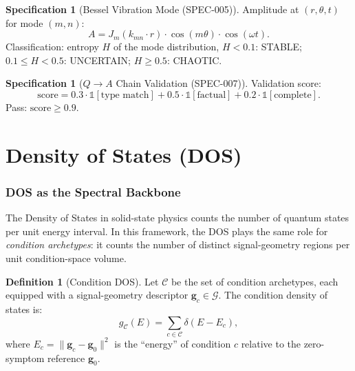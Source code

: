 \documentclass[11pt,twoside]{article}
\theoremstyle{plain}
\theoremstyle{definition}
\newtheorem{definition}[theorem]{Definition}
\newtheorem{specification}[theorem]{Specification}
\theoremstyle{remark}
\begin{document}
\begin{specification}[Bessel Vibration Mode (SPEC-005)]\label{spec:bessel}
Amplitude at $(r,\theta,t)$ for mode $(m,n)$:
\begin{equation}
  A = J_m(k_{mn}\cdot r)\cdot\cos(m\theta)\cdot\cos(\omega t).
\end{equation}
Classification: entropy $H$ of the mode distribution,
$H<0.1$: STABLE; $0.1\le H<0.5$: UNCERTAIN; $H\ge 0.5$: CHAOTIC.
\end{specification}

\begin{specification}[$Q\to A$ Chain Validation (SPEC-007)]\label{spec:qa}
Validation score:
\begin{equation}
  \mathrm{score} = 0.3\cdot\mathbb{1}[\text{type match}]
                 + 0.5\cdot\mathbb{1}[\text{factual}]
                 + 0.2\cdot\mathbb{1}[\text{complete}].
\end{equation}
Pass: $\mathrm{score}\ge 0.9$.
\end{specification}

\part{Density of States (DOS)}

\section{DOS as the Spectral Backbone}

The Density of States in solid-state physics counts the number of quantum
states per unit energy interval.  In this framework, the DOS plays the same
role for \emph{condition archetypes}: it counts the number of distinct
signal-geometry regions per unit condition-space volume.

\begin{definition}[Condition DOS]\label{def:dos}
Let $\mathcal{C}$ be the set of condition archetypes, each equipped with a
signal-geometry descriptor $\mathbf{g}_c\in\mathcal{G}$.  The condition
density of states is:
\begin{equation}
  g_\mathcal{C}(E) = \sum_{c\in\mathcal{C}} \delta(E - E_c),
\end{equation}
where $E_c = \|\mathbf{g}_c - \mathbf{g}_0\|^2$ is the ``energy'' of condition
$c$ relative to the zero-symptom reference $\mathbf{g}_0$.
\end{definition}
\end{document}
